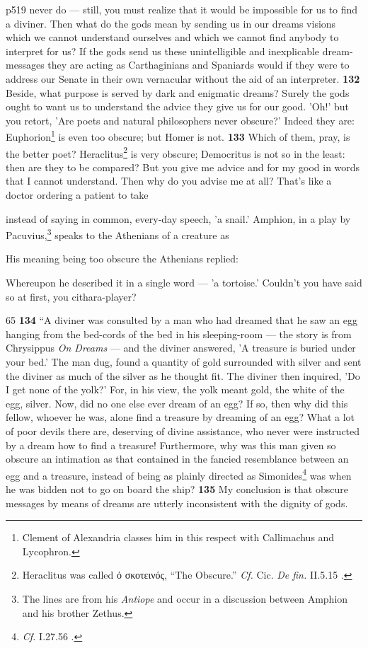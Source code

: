 p519 never do \texthebrew{—} still, you must realize that it would be impossible for us to find a diviner. Then what do the gods mean by sending us in our dreams visions which we cannot understand ourselves and which we cannot find anybody to interpret for us? If the gods send us these unintelligible and inexplicable dream-messages they are acting as Carthaginians and Spaniards would if they were to address our Senate in their own vernacular without the aid of an interpreter. \textbf{132} Beside, what purpose is served by dark and enigmatic dreams? Surely the gods ought to want us to understand the advice they give us for our good. 'Oh!' but you retort, 'Are poets and natural philosophers never obscure?' Indeed they are: Euphorion\texthebrew{}\footnote{Clement of Alexandria classes him in this respect with Callimachus and Lycophron.

} is even too obscure; but Homer is not. \textbf{133} Which of them, pray, is the better poet? Heraclitus\texthebrew{}\footnote{Heraclitus was called \textgreek{\texthebrew{ὁ} σκοτεινός}, ``The Obscure.'' \emph{Cf.} Cic. \emph{De fin.} II.5.15 .

} is very obscure; Democritus is not so in the least: then are they to be compared? But you give me advice and for my good in words that I cannot understand. Then why do you advise me at all? That's like a doctor ordering a patient to take

instead of saying in common, every-day speech, 'a snail.' Amphion, in a play by Pacuvius,\texthebrew{}\footnote{The lines are from his \emph{Antiope} and occur in a discussion between Amphion and his brother Zethus.

} speaks to the Athenians of a creature as

His meaning being too obscure the Athenians replied:

Whereupon he described it in a single word \texthebrew{—} 'a tortoise.' Couldn't you have said so at first, you cithara-player?

65
\textbf{134} ``A diviner was consulted by a man who had dreamed that he saw an egg hanging from the bed-cords of the bed in his sleeping-room \texthebrew{—} the story is from Chrysippus \emph{On Dreams} \texthebrew{—} and the diviner answered, 'A treasure is buried under your bed.' The man dug, found a quantity of gold surrounded with silver and sent the diviner as much of the silver as he thought fit. The diviner then inquired, 'Do I get none of the yolk?' For, in his view, the yolk meant gold, the white of the egg, silver. Now, did no one else ever dream of an egg? If so, then why did this fellow, whoever he was, alone find a treasure by dreaming of an egg? What a lot of poor devils there are, deserving of divine assistance, who never were instructed by a dream how to find a treasure! Furthermore, why was this man given so obscure an intimation as that contained in the fancied resemblance between an egg and a treasure, instead of being as plainly directed as Simonides\texthebrew{}\footnote{\emph{Cf.}
I.27.56 .

} was when he was bidden not to go on board the ship? \textbf{135} My conclusion is that obscure messages by means of dreams are utterly inconsistent with the dignity of gods.

